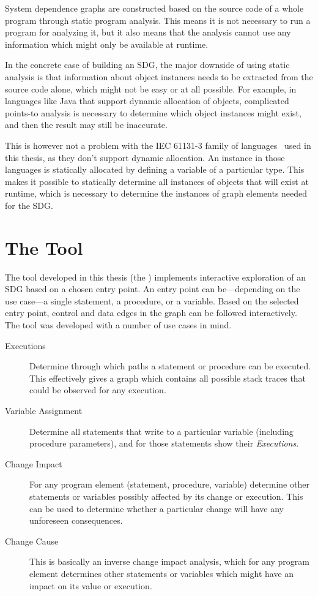 System dependence graphs are constructed based on the source code of a whole program through static program analysis. 
This means it is not necessary to run a program for analyzing it, but it also means that the analysis cannot use any 
information which might only be available at runtime.

In the concrete case of building an SDG, the major downside of using static analysis is that information about object 
instances needs to be extracted from the source code alone, which might not be easy or at all possible. For example, in 
languages like Java that support dynamic allocation of objects, complicated points-to analysis is necessary to 
determine which object instances might exist, and then the result may still be inaccurate.

This is however not a problem with the IEC 61131-3 family of languages~\cite{IEC61131:2003} used in this thesis, as 
they don't support dynamic allocation. An instance in those languages is statically allocated by defining a variable of 
a particular type. This makes it possible to statically determine all instances of objects that will exist at runtime, 
which is necessary to determine the instances of graph elements needed for the SDG.


\section{The Tool}

The tool developed in this thesis (the \emph{\SB}) implements interactive exploration of an SDG based on a chosen entry 
point. An entry point can be---depending on the use case---a single statement, a procedure, or a variable. Based on the 
selected entry point, control and data edges in the graph can be followed interactively. The tool was developed with a 
number of use cases in mind.

\begin{description}
  \item[Executions] Determine through which paths a statement or procedure can be executed. This effectively gives a 
  graph which contains all possible stack traces that could be observed for any execution.
  
  \item[Variable Assignment] Determine all statements that write to a particular variable (including procedure 
  parameters), and for those statements show their \emph{Executions}.
  
  \item[Change Impact] For any program element (statement, procedure, variable) determine other statements or variables 
  possibly affected by its change or execution. This can be used to determine whether a particular change will have any 
  unforeseen consequences.
  
  \item[Change Cause] This is basically an inverse change impact analysis, which for any program element determines 
  other statements or variables which might have an impact on its value or execution.
\end{description}

